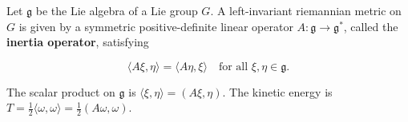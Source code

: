 Let $\mathfrak{g}$ be the Lie algebra of a Lie group $G$. A left-invariant riemannian metric on $G$ is given by a symmetric positive-definite linear operator $A: \mathfrak{g} \to \mathfrak{g}^*$, called the \textbf{inertia operator}, satisfying

$$\langle A\xi, \eta \rangle = \langle A\eta, \xi \rangle \quad \text{for all } \xi, \eta \in \mathfrak{g}.$$

The scalar product on $\mathfrak{g}$ is $\langle \xi, \eta \rangle = (A\xi, \eta)$. The kinetic energy is $T = \frac{1}{2}\langle \omega, \omega \rangle = \frac{1}{2}(A\omega, \omega)$.
